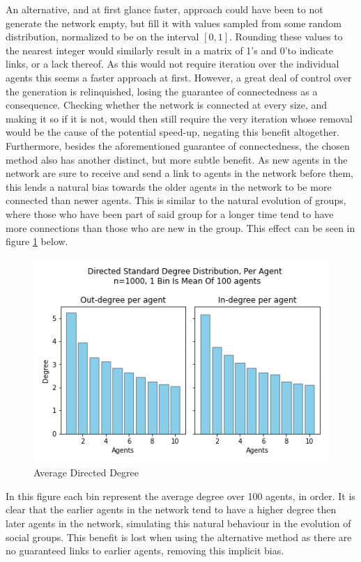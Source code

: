 \documentclass{article}
\begin{document}
An alternative, and at first glance faster, approach could have been to not generate the network empty, but fill it with values sampled from some random distribution, normalized to be on the interval $[0, 1]$. Rounding these values to the nearest integer would similarly result in a matrix of 1's and 0'to indicate links, or a lack thereof. As this would not require iteration over the individual agents this seems a faster approach at first. However, a great deal of control over the generation is relinquished, losing the guarantee of connectedness as a consequence. Checking whether the network is connected at every size, and making it so if it is not, would then still require the very iteration whose removal would be the cause of the potential speed-up, negating this benefit altogether. Furthermore, besides the aforementioned guarantee of connectedness, the chosen method also has another distinct, but more subtle benefit. As new agents in the network are sure to receive and send a link to agents in the network before them, this lends a natural bias towards the older agents in the network to be more connected than newer agents. This is similar to the natural evolution of groups, where those who have been part of said group for a longer time tend to have more connections than those who are new in the group. This effect can be seen in figure \ref{degree:agent} below.

\begin{center}
    \begin{figure}[!htbp]
        \centering
        \includegraphics[width=.8\textwidth]{ThesisKI/Images/DirectedStandardPerAgent.png}
        \caption{Average Directed Degree}
        \label{degree:agent}
    \end{figure}
\end{center}

\noindent In this figure each bin represent the average degree over 100 agents, in order. It is clear that the earlier agents in the network tend to have a higher degree then later agents in the network, simulating this natural behaviour in the evolution of social groups. This benefit is lost when using the alternative method as there are no guaranteed links to earlier agents, removing this implicit bias.
\end{document}
